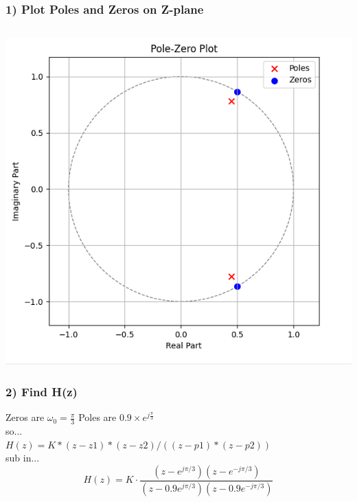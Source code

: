\documentclass[12pt,letterpaper]{article}
\begin{document}
\subsubsection*{1) Plot Poles and Zeros on Z-plane}
\inputminted[frame=lines,framesep=2mm,baselinestretch=1.2,bgcolor=LightGray,breaklines,fontsize=\tiny,linenos]{python}{p1p1.py}
\includegraphics*[scale=0.5]{p1p1.png}
\newpage
\subsubsection*{2) Find H(z)}
Zeros are $\omega_0 = \frac{\pi}{3}$
Poles are $0.9 \times e^{j \frac{\pi}{3}}$
\\ so... \\
$H(z) = K * (z - z1) * (z - z2) / ((z - p1) * (z - p2))$
\\ sub in... \\
$$H(z) = K \cdot \frac{(z - e^{j\pi/3})(z - e^{-j\pi/3})}{(z - 0.9e^{j\pi/3})(z - 0.9e^{-j\pi/3})}$$
\end{document}
